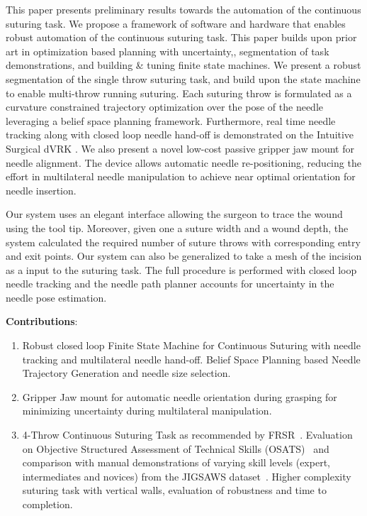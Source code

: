 This paper presents preliminary results towards the automation of the continuous suturing task. We propose a framework of software and hardware that enables robust automation of the continuous suturing task. 
This paper builds upon prior art in optimization based planning with uncertainty\cite{patil2014gaussian},, segmentation of task demonstrations\cite{krishnan2015tsc, lea2015improved}, and building \& tuning finite state machines\cite{Murali2015Learning}. We present a robust segmentation of the single throw suturing task, and build upon the state machine to enable multi-throw running suturing. Each suturing throw is formulated as a curvature constrained trajectory optimization over the pose of the needle leveraging a belief space planning framework. Furthermore, real time needle tracking along with closed loop needle hand-off is demonstrated on the Intuitive Surgical dVRK \cite{Kazanzides2014}. We also present a novel low-cost passive gripper jaw mount for needle alignment. The device allows automatic needle re-positioning, reducing the effort in multilateral needle manipulation to achieve near optimal orientation for needle insertion.

Our system uses an elegant interface allowing the surgeon to trace the wound using the tool tip. Moreover, given one a suture width and a wound depth, the system calculated the required number of suture throws with corresponding entry and exit points. Our system can also be generalized to take a mesh of the incision as a input to the suturing task. The full procedure is performed with closed loop needle tracking and the needle path planner accounts for uncertainty in the needle pose estimation.

\vspace{5pt}
\noindent \textbf{Contributions}:
\begin{enumerate}[noitemsep, leftmargin=*]
\item Robust closed loop Finite State Machine for Continuous Suturing with needle tracking and multilateral needle hand-off. Belief Space Planning based Needle Trajectory Generation and needle size selection.
\item Gripper Jaw mount for automatic needle orientation during grasping for minimizing uncertainty during multilateral manipulation.
\item 4-Throw Continuous Suturing Task as recommended by FRSR~\cite{stegemann2013fundamental}. Evaluation on Objective Structured Assessment of Technical Skills (OSATS)~\cite{schreuder2012training} and comparison with manual demonstrations of varying skill levels (expert, intermediates and novices) from the JIGSAWS dataset~\cite{gao2014jhu}. Higher complexity suturing task with vertical walls, evaluation of robustness and time to completion.
\end{enumerate}


